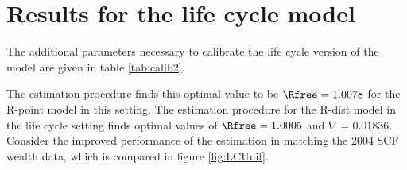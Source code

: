 \documentclass[\econtexRoot/Chp1proposal]{subfiles}
\begin{document}
\hypertarget{resultslc}{}
\section{Results for the life cycle model}\notinsubfile{\label{sec:resultslc}}

\par The additional parameters necessary to calibrate the life cycle version of the model are given in table \ref{tab:calib2}.

\unskip

\par The estimation procedure finds this optimal value to be $\Rfree = 1.0078$ for the R-point model in this setting. The estimation procedure for the R-dist model in the life cycle setting finds optimal values of $\Rfree = 1.0005$ and $\nabla = 0.01836$. Consider the improved performance of the estimation in matching the 2004 SCF wealth data, which is compared in figure \ref{fig:LCUnif}.

\unskip



\onlyinsubfile{}

\end{document}
